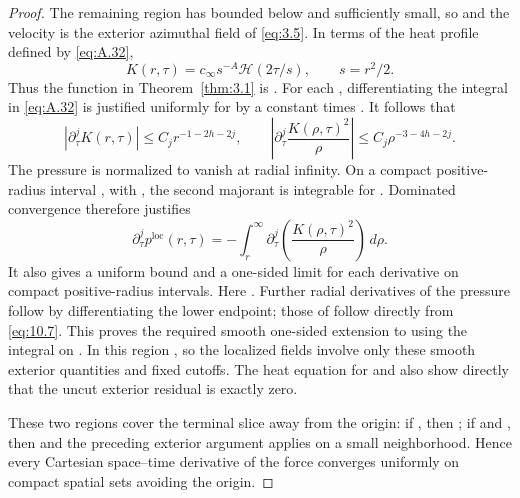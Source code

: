 \begin{proof}
The remaining region has  bounded below and
 sufficiently small, so 
and the velocity is the exterior azimuthal field
 of \eqref{eq:3.5}. In terms of the heat profile
 defined by \eqref{eq:A.32},
\begin{equation}
K(r,\tau)=c_\infty s^{-A}\mathcal H(2\tau/s),
\qquad s=r^2/2.
\tag{10.7}\label{eq:10.7}
\end{equation}
Thus the function in Theorem~\ref{thm:3.1} is
. For each
, differentiating the integral in \eqref{eq:A.32} is justified uniformly for
 by a constant times
. It follows that
\begin{equation}
|\partial_\tau^jK(r,\tau)|\leq C_jr^{-1-2h-2j},
\qquad
\left|\partial_\tau^j\frac{K(\rho,\tau)^2}{\rho}\right|
\leq C_j\rho^{-3-4h-2j}.
\tag{10.8}\label{eq:10.8}
\end{equation}
The pressure is normalized to vanish at radial infinity. On a compact positive-radius interval
, with , the second majorant is
integrable for . Dominated convergence therefore justifies
\[
\partial_\tau^jp^{\mathrm{loc}}(r,\tau)
=-\int_r^\infty\partial_\tau^j\left(\frac{K(\rho,\tau)^2}{\rho}\right)\,d\rho.
\]
It also gives a uniform bound and a one-sided limit for each derivative on compact positive-radius
intervals. Here . Further radial derivatives of the
pressure follow by differentiating the lower endpoint; those of  follow
directly from \eqref{eq:10.7}. This proves the required smooth one-sided extension to
 using the integral on . In this
region , so the localized fields involve only these smooth
exterior quantities and fixed cutoffs. The heat equation for  and
 also show directly that the uncut exterior
residual is exactly zero.

These two regions cover the terminal slice away from the origin: if
, then ; if
 and , then
 and the preceding exterior argument applies on a small neighborhood.
Hence every Cartesian space--time derivative of the force converges uniformly on compact spatial
sets avoiding the origin.


\end{proof}
